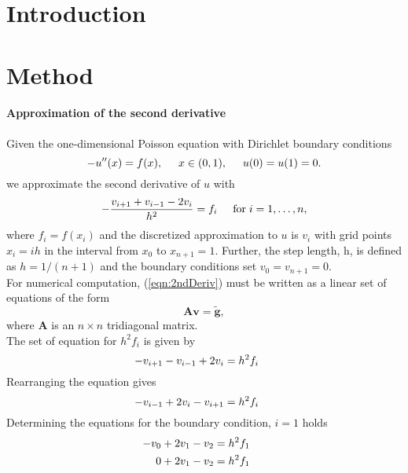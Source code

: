 \documentclass[%
oneside,                 %
final,                   %
10pt]{article}
\begin{document}
\section{Introduction}
\section{Method}
\paragraph{Approximation of the second derivative}
Given the one-dimensional Poisson equation with Dirichlet boundary conditions
\begin{equation*}
-u''(x) = f(x), \hspace{0.5cm} x\in(0,1), \hspace{0.5cm} u(0) = u(1) = 0.
\end{equation*}
we approximate the second derivative of $u$ with
\begin{equation}\label{eqn:2ndDeriv}
   -\frac{v_{i+1}+v_{i-1}-2v_i}{h^2} = f_i  \hspace{0.5cm} \mathrm{for} \hspace{0.1cm} i=1,\dots, n,
\end{equation}
where $f_i=f(x_i)$ and the discretized approximation to $u$ is $v_i$ with grid points $x_i = ih$ in the interval from $x_0$ to $x_{n+1}=1$.
Further, the step length, h,  is defined as $h=1/(n+1)$ and the boundary conditions set $v_0 = v_{n+1}=0$. \\
For numerical computation, (\ref{eqn:2ndDeriv}) must be written as a linear set of equations of the form
\begin{equation*}
   \mathbf{A}\mathbf{v} = \tilde{\mathbf{g}},
\end{equation*}
where $\mathbf{A}$ is an $n\times n$  tridiagonal matrix.\\
The set of equation for $h^2f_i$ is given by
\begin{equation*}
   -v_{i+1}-v_{i-1}+2v_i = h^2f_i  \hspace{0.5cm}
\end{equation*}
Rearranging the equation gives
\begin{equation*}
  -v_{i-1}+2v_i - v_{i+1}= h^2f_i  \hspace{0.5cm}
\end{equation*}
Determining the equations for the boundary condition, $i=1$ holds
\begin{equation*}
\begin{aligned}
  -v_{0}+2v_1 - v_{2}&= h^2f_1  \hspace{0.5cm} \\
  0 + 2v_1 - v_{2}&= h^2f_1  \hspace{0.5cm}
\end{aligned}
\end{equation*}
\end{document}
